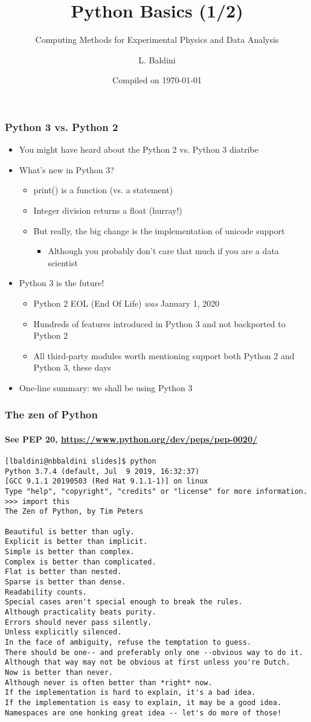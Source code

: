 \documentclass[9pt]{beamer}
\title{Python Basics (1/2)}
\subtitle{Computing Methods for Experimental Physics and Data Analysis}
\date{Compiled on \today}
\author{L. Baldini}
\institute[UNIPI and INFN]{Universit\`a and INFN--Pisa}
\begin{document}
\titleframe

\begin{frame}
  \frametitle{Python 3 vs. Python 2}
  \begin{itemize}
  \item You might have heard about the Python 2 vs. Python 3 diatribe
  \item What's new in Python 3?
    \begin{itemize}
    \item print() is a function (vs. a statement)
    \item Integer division returns a float (hurray!)
    \item But really, \alert{the big change is the implementation of
      unicode support}
      \begin{itemize}
      \item Although you probably don't care that much if you are a data
        scientist
      \end{itemize}
    \end{itemize}
  \item Python 3 is the future!
    \begin{itemize}
    \item Python 2 EOL (End Of Life) \emph{was} January 1, 2020
    \item Hundreds of features introduced in Python 3 and not backported to
      Python 2
    \item All third-party modules worth mentioning support both Python 2 and
      Python 3, these days
    \end{itemize}
  \item \alert{One-line summary: we shall be using Python 3}
  \end{itemize}
\end{frame}


\begin{frame}[fragile]
  \frametitle{The zen of Python}
  \framesubtitle{See PEP 20, \url{https://www.python.org/dev/peps/pep-0020/}}
  \begin{Verbatim}
[lbaldini@nbbaldini slides]$ python
Python 3.7.4 (default, Jul  9 2019, 16:32:37)
[GCC 9.1.1 20190503 (Red Hat 9.1.1-1)] on linux
Type "help", "copyright", "credits" or "license" for more information.
>>> import this
The Zen of Python, by Tim Peters

Beautiful is better than ugly.
Explicit is better than implicit.
Simple is better than complex.
Complex is better than complicated.
Flat is better than nested.
Sparse is better than dense.
Readability counts.
Special cases aren't special enough to break the rules.
Although practicality beats purity.
Errors should never pass silently.
Unless explicitly silenced.
In the face of ambiguity, refuse the temptation to guess.
There should be one-- and preferably only one --obvious way to do it.
Although that way may not be obvious at first unless you're Dutch.
Now is better than never.
Although never is often better than *right* now.
If the implementation is hard to explain, it's a bad idea.
If the implementation is easy to explain, it may be a good idea.
Namespaces are one honking great idea -- let's do more of those!
  \end{Verbatim}
\end{frame}
\end{document}

